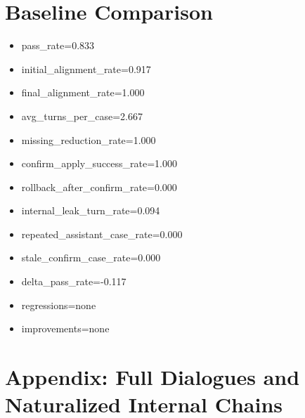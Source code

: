 \documentclass[11pt]{ctexart}
\begin{document}
\section{Baseline Comparison}
\begin{itemize}
\item pass\_rate=0.833
\item initial\_alignment\_rate=0.917
\item final\_alignment\_rate=1.000
\item avg\_turns\_per\_case=2.667
\item missing\_reduction\_rate=1.000
\item confirm\_apply\_success\_rate=1.000
\item rollback\_after\_confirm\_rate=0.000
\item internal\_leak\_turn\_rate=0.094
\item repeated\_assistant\_case\_rate=0.000
\item stale\_confirm\_case\_rate=0.000
\item delta\_pass\_rate=-0.117
\item regressions=none
\item improvements=none
\end{itemize}
\appendix
\section{Appendix: Full Dialogues and Naturalized Internal Chains}
\end{document}
